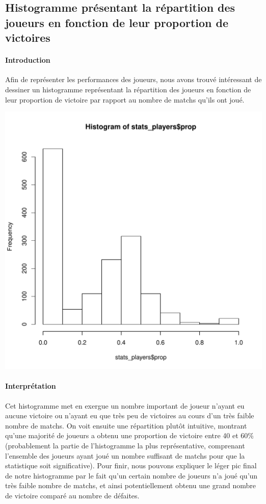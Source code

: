 \documentclass{report}
\begin{document}
\subsection{Histogramme présentant la répartition des joueurs en fonction de
leur proportion de victoires}
\paragraph{Introduction}
Afin de représenter les performances des joueurs, nous avons trouvé intéressant
de dessiner un histogramme représentant la répartition des joueurs en fonction
de leur proportion de victoire par rapport au nombre de matchs qu'ils ont joué.
\begin{center}
    \includegraphics[width=\textwidth]{hist.pdf}
\end{center}
\paragraph{Interprétation}
Cet histogramme met en exergue un nombre important de joueur n'ayant eu aucune
victoire ou n'ayant eu que très peu de victoires au cours d'un très faible nombre de matchs. On voit ensuite une répartition plutôt intuitive, montrant qu'une
majorité de joueurs a obtenu une proportion de victoire entre 40 et 60\% (probablement la partie de l'histogramme la plus représentative, comprenant l'ensemble des joueurs ayant joué un nombre suffisant de matchs pour que la statistique soit significative). Pour
finir, nous pouvons expliquer le léger pic final de notre histogramme par le
fait qu'un certain nombre de joueurs n'a joué qu'un très faible nombre de matchs, et ainsi potentiellement obtenu
une grand nombre de victoire comparé au nombre de défaites.
\end{document}
